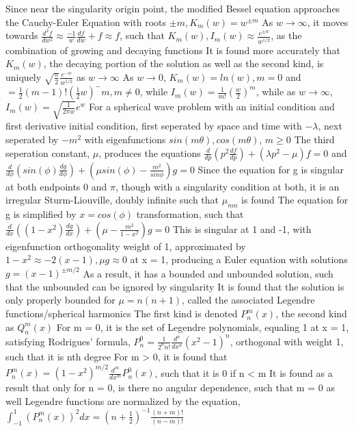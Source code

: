 \documentclass[11 pt, twoside]{article}
\newenvironment{outline*}
{
	\begin{outline}[enumerate]
	}
	{\end{outline}
}
\begin{document}
\begin{outline*}
			\4 Since near the singularity origin point, the modified Bessel equation approaches the Cauchy-Euler Equation with roots $\pm m, K_m(w) = w^{\pm m}$
			\4 As $w \to \infty$, it moves towards $\frac{d^2f}{dw^2} \approx \frac{-1}{w}\frac{df}{dw} + f \approx f$, such that $K_m(w), I_m(w) \approx \frac{e^{\pm w}}{w^{1/2}}$, as the combination of growing and decaying functions
			\4 It is found more accurately that $K_m(w)$, the decaying portion of the solution as well as the second kind, is uniquely $\sqrt{\frac{\pi}{2}}\frac{e^{-w}}{w^{1/2}}$ as $w \to \infty$
			\4 As $w \to 0$, $K_m(w) = ln(w), m = 0$ and $= \frac{1}{2}(m - 1)!(\frac{1}{2}w)^-m, m \neq 0$, while $I_m(w) = \frac{1}{m!}(\frac{w}{2})^m$, while as $w \to \infty$, $I_m(w) = \sqrt{\frac{1}{{2\pi w}}}e^w$
\1 For a spherical wave problem with an initial condition and first derivative initial condition, first seperated by space and time with $-\lambda$, next seperated by $-m^2$ with eigenfunctions $sin(m\theta), cos(m\theta)$, $m \geq 0$
	\2 The third seperation constant, $\mu$, produces the equations $\frac{d}{dp}(p^2\frac{df}{dp}) + (\lambda p^2 - \mu)f = 0$ and $\frac{d}{d\phi}(sin(\phi)\frac{dg}{d\phi}) + (\mu sin(\phi) - \frac{m^2}{sin\phi})g = 0$
	\2 Since the equation for g is singular at both endpoints 0 and $\pi$, though with a singularity condition at both, it is an irregular Sturm-Liouville, doubly infinite such that $\mu_{mn}$ is found
		\3 The equation for g is simplified by $x = cos(\phi)$ transformation, such that $\frac{d}{dx}((1 - x^2)\frac{dg}{dx}) + (\mu - \frac{m^2}{1 - x^2})g = 0$
			\4 This is singular at 1 and -1, with eigenfunction orthogonality weight of 1, approximated by $1 - x^2 \approx -2(x - 1), \mu g \approx 0$ at x = 1, producing a Euler equation with solutions $g = (x - 1)^{\pm m/2}$
			\4 As a result, it has a bounded and unbounded solution, such that the unbounded can be ignored by singularity
		\3 It is found that the solution is only properly bounded for $\mu = n(n  + 1)$, called the associated Legendre functions/spherical harmonics
			\4 The first kind is denoted $P^m_n(x)$, the second kind as $Q^m_n(x)$
			\4 For m = 0, it is the set of Legendre polynomials, equaling 1 at x = 1, satisfying Rodrigues' formula, $P^0_n = \frac{1}{2^nn!}\frac{d^n}{dx^n}(x^2 - 1)^n$, orthogonal with weight 1, such that it is nth degree
			\4 For m > 0, it is found that $P^m_n(x) = (1 - x^2)^{m/2} \frac{d^m}{dx^m}P^0_n(x)$, such that it is 0 if n < m
			\4 It is found as a result that only for n = 0, is there no angular dependence, such that m = 0 as well
		\3 Legendre functions are normalized by the equation, $\int^1_{-1} (P^m_n(x))^2dx = (n + \frac{1}{2})^{-1}\frac{(n + m)!}{(n - m)!}$

\end{outline*}
\end{document}
